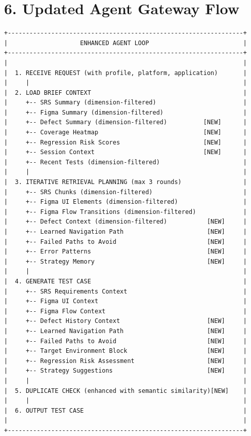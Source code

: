 \section*{6. Updated Agent Gateway Flow}

\begingroup\scriptsize\begin{verbatim}
+-----------------------------------------------------------------+
|                    ENHANCED AGENT LOOP                          |
+-----------------------------------------------------------------+
|                                                                 |
|  1. RECEIVE REQUEST (with profile, platform, application)       |
|     |                                                           |
|  2. LOAD BRIEF CONTEXT                                          |
|     +-- SRS Summary (dimension-filtered)                        |
|     +-- Figma Summary (dimension-filtered)                      |
|     +-- Defect Summary (dimension-filtered)          [NEW]      |
|     +-- Coverage Heatmap                             [NEW]      |
|     +-- Regression Risk Scores                       [NEW]      |
|     +-- Session Context                              [NEW]      |
|     +-- Recent Tests (dimension-filtered)                       |
|     |                                                           |
|  3. ITERATIVE RETRIEVAL PLANNING (max 3 rounds)                 |
|     +-- SRS Chunks (dimension-filtered)                         |
|     +-- Figma UI Elements (dimension-filtered)                  |
|     +-- Figma Flow Transitions (dimension-filtered)             |
|     +-- Defect Context (dimension-filtered)           [NEW]     |
|     +-- Learned Navigation Path                       [NEW]     |
|     +-- Failed Paths to Avoid                         [NEW]     |
|     +-- Error Patterns                                [NEW]     |
|     +-- Strategy Memory                               [NEW]     |
|     |                                                           |
|  4. GENERATE TEST CASE                                          |
|     +-- SRS Requirements Context                                |
|     +-- Figma UI Context                                        |
|     +-- Figma Flow Context                                      |
|     +-- Defect History Context                        [NEW]     |
|     +-- Learned Navigation Path                       [NEW]     |
|     +-- Failed Paths to Avoid                         [NEW]     |
|     +-- Target Environment Block                      [NEW]     |
|     +-- Regression Risk Assessment                    [NEW]     |
|     +-- Strategy Suggestions                          [NEW]     |
|     |                                                           |
|  5. DUPLICATE CHECK (enhanced with semantic similarity)[NEW]    |
|     |                                                           |
|  6. OUTPUT TEST CASE                                            |
|                                                                 |
+-----------------------------------------------------------------+
\end{verbatim}\endgroup

